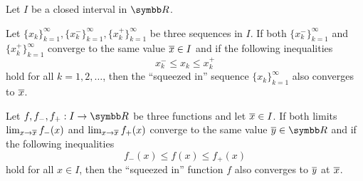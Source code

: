 \begin{lemma}\label{thm:squeeze_lemma}
  Let \( I \) be a closed interval in \( \BR \).

  \begin{lemenum}
     Let \( \{ x_k \}_{k=1}^\infty, \{ x_k^- \}_{k=1}^\infty, \{ x_k^+ \}_{k=1}^\infty \) be three sequences in \( I \). If both \( \{ x_k^- \}_{k=1}^\infty \) and \( \{ x_k^+ \}_{k=1}^\infty \) converge to the same value \( \overline{x} \in I \) and if the following inequalities
    \begin{equation*}
      x_k^- \leq x_k \leq x_k^+
    \end{equation*}
    hold for all \( k = 1, 2, \ldots \), then the \enquote{squeezed in} sequence \( \{ x_k \}_{k=1}^\infty \) also converges to \( \overline{x} \).

     Let \( f, f_-, f_+: I \to \BR \) be three functions and let \( \overline{x} \in I \). If both limits \( \lim_{x \to \overline{x}} f_-(x) \) and \( \lim_{x \to \overline{x}} f_+(x) \) converge to the same value \( \Ol y \in \BR \) and if the following inequalities
    \begin{equation*}
      f_-(x) \leq f(x) \leq f_+(x)
    \end{equation*}
    hold for all \( x \in I \), then the \enquote{squeezed in} function \( f \) also converges to \( \overline{y} \) at \( \overline{x} \).
  \end{lemenum}
\end{lemma}
